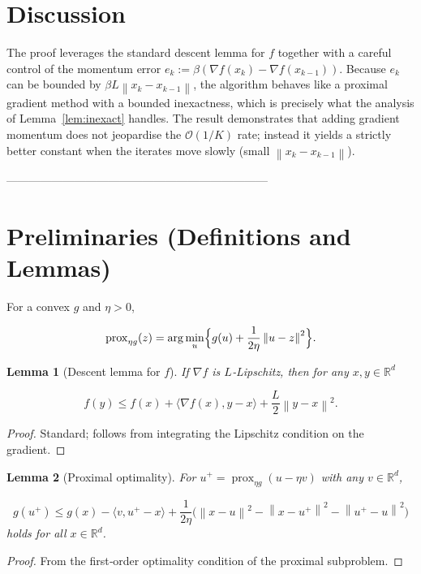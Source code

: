 \documentclass{article}
\newtheorem{lemma}{Lemma}
\newcommand{\prox}{\operatorname{prox}}
\newcommand{\R}{\mathbb{R}}
\newcommand{\norm}[1]{\left\lVert #1\right\rVert}
\newcommand{\inner}[2]{\langle #1,#2\rangle}
\newcommand{\grad}{\nabla}
\begin{document}
\section*{Discussion}
The proof leverages the standard descent lemma for $f$ together with a careful control of the momentum error $e_k:=\beta(\grad f(x_k)-\grad f(x_{k-1}))$. Because $e_k$ can be bounded by $\beta L\norm{x_k-x_{k-1}}$, the algorithm behaves like a proximal gradient method with a bounded inexactness, which is precisely what the analysis of Lemma~\ref{lem:inexact} handles. The result demonstrates that adding gradient momentum does not jeopardise the $\mathcal O(1/K)$ rate; instead it yields a strictly better constant when the iterates move slowly (small $\norm{x_k-x_{k-1}}$).

---------------------------------------------------------------------

\section*{Preliminaries (Definitions and Lemmas)}
\begin{definition}
For a convex $g$ and $\eta>0$,  

\[
\prox_{\eta g}(z)=\arg\min_{u}\Bigl\{g(u)+\frac{1}{2\eta}\norm{u-z}^{2}\Bigr\}.
\]
\end{definition}

\begin{lemma}[Descent lemma for $f$]\label{lem:descent}
If $\grad f$ is $L$‑Lipschitz, then for any $x,y\in\R^{d}$  

\[
f(y)\le f(x)+\inner{\grad f(x)}{y-x}+\frac{L}{2}\norm{y-x}^{2}.
\]
\end{lemma}
\begin{proof}
Standard; follows from integrating the Lipschitz condition on the gradient. \qedhere
\end{proof}

\begin{lemma}[Proximal optimality]\label{lem:proxopt}
For $u^{+}= \prox_{\eta g}(u-\eta v)$ with any $v\in\R^{d}$,  

\[
g(u^{+})\le g(x)-\inner{v}{u^{+}-x}+\frac{1}{2\eta}\bigl(\norm{x-u}^{2}-\norm{x-u^{+}}^{2}-\norm{u^{+}-u}^{2}\bigr)
\]
holds for all $x\in\R^{d}$.
\end{lemma}
\begin{proof}
From the first‑order optimality condition of the proximal subproblem. \qedhere
\end{proof}
\end{document}
